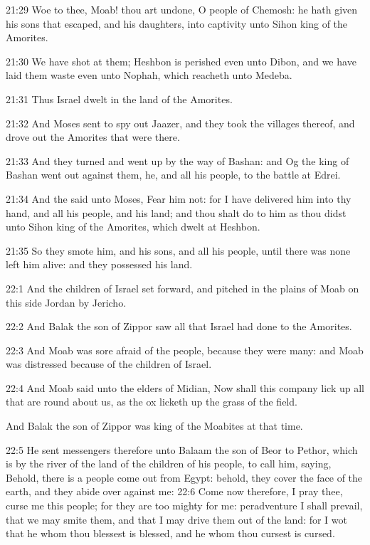 21:29 Woe to thee, Moab! thou art undone, O people of Chemosh: he hath
given his sons that escaped, and his daughters, into captivity unto
Sihon king of the Amorites.

21:30 We have shot at them; Heshbon is perished even unto Dibon, and
we have laid them waste even unto Nophah, which reacheth unto Medeba.

21:31 Thus Israel dwelt in the land of the Amorites.

21:32 And Moses sent to spy out Jaazer, and they took the villages
thereof, and drove out the Amorites that were there.

21:33 And they turned and went up by the way of Bashan: and Og the
king of Bashan went out against them, he, and all his people, to the
battle at Edrei.

21:34 And the \LORD said unto Moses, Fear him not: for I have delivered
him into thy hand, and all his people, and his land; and thou shalt do
to him as thou didst unto Sihon king of the Amorites, which dwelt at
Heshbon.

21:35 So they smote him, and his sons, and all his people, until there
was none left him alive: and they possessed his land.

22:1 And the children of Israel set forward, and pitched in the plains
of Moab on this side Jordan by Jericho.

22:2 And Balak the son of Zippor saw all that Israel had done to the
Amorites.

22:3 And Moab was sore afraid of the people, because they were many:
and Moab was distressed because of the children of Israel.

22:4 And Moab said unto the elders of Midian, Now shall this company
lick up all that are round about us, as the ox licketh up the grass of
the field.

And Balak the son of Zippor was king of the Moabites at that time.

22:5 He sent messengers therefore unto Balaam the son of Beor to
Pethor, which is by the river of the land of the children of his
people, to call him, saying, Behold, there is a people come out from
Egypt: behold, they cover the face of the earth, and they abide over
against me: 22:6 Come now therefore, I pray thee, curse me this
people; for they are too mighty for me: peradventure I shall prevail,
that we may smite them, and that I may drive them out of the land: for
I wot that he whom thou blessest is blessed, and he whom thou cursest
is cursed.

